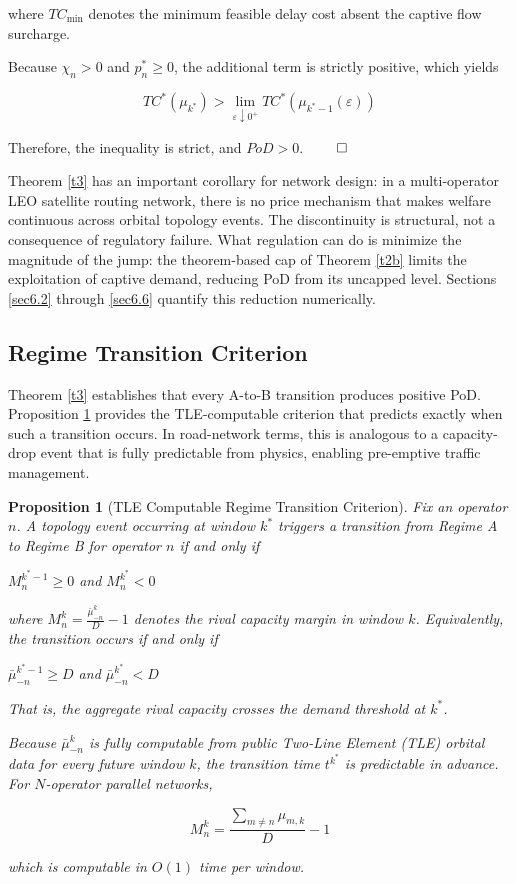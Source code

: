 \documentclass[review,3p,authoryear]{elsarticle}
\newtheorem{proposition}[theorem]{Proposition}
\begin{document}
where $TC_{\min}$ denotes the minimum feasible delay cost absent the captive flow surcharge.

Because ${\chi}_{n}>0$ and $p_{n}^{*}{\ge}0$, the additional term is strictly positive, which yields

\begin{equation}
TC^{*}({\mu}_{k^{*}})>\lim_{{\varepsilon}{\downarrow}0^{+}}TC^{*} \left({\mu}_{k^{*}-1}({\varepsilon})\right)
\end{equation}

Therefore, the inequality is strict, and $PoD>0$. $\qed$

Theorem \ref{t3} has an important corollary for network design: in a multi-operator LEO satellite routing network, there is no price mechanism that makes welfare continuous across orbital topology events. The discontinuity is structural, not a consequence of regulatory failure. What regulation can do is minimize the magnitude of the jump: the theorem-based cap of Theorem \ref{t2b} limits the exploitation of captive demand, reducing PoD from its uncapped level. Sections \ref{sec6.2} through \ref{sec6.6} quantify this reduction numerically.

\subsection{Regime Transition Criterion}

Theorem \ref{t3} establishes that every A-to-B transition produces positive PoD. Proposition \ref{p2} provides the TLE-computable criterion that predicts exactly when such a transition occurs. In road-network terms, this is analogous to a capacity-drop event \citet{hall1987interpretation} that is fully predictable from physics, enabling pre-emptive traffic management.

\begin{proposition}[TLE Computable Regime Transition Criterion]\label{p2}
Fix an operator $n$. A topology event occurring at window $k^{*}$ triggers a transition from Regime A to Regime B for operator $n$ if and only if

$M_{n}^{k^{*}-1}{\ge}0$ and $M_{n}^{k^{*}}<0$

where $M_{n}^{k}=\frac{\bar{{\mu}}_{-n}^{k}}{D}-1$ denotes the rival capacity margin in window $k$. Equivalently, the transition occurs if and only if

$\bar{{\mu}}_{-n}^{k^{*}-1}{\ge}D$ and $\bar{{\mu}}_{-n}^{k^{*}}<D$

That is, the aggregate rival capacity crosses the demand threshold at $k^{*}$.

Because $\bar{{\mu}}_{-n}^{k}$ is fully computable from public Two-Line Element (TLE) orbital data for every future window $k$, the transition time $t^{k^{*}}$ is predictable in advance. For $N$-operator parallel networks,

\begin{equation}
M_{n}^{k}=\frac{\sum_{m{\ne}n}^{} {\mu}_{m,k}}{D}-1
\end{equation}

which is computable in $O(1)$ time per window.
\end{proposition}
\end{document}
